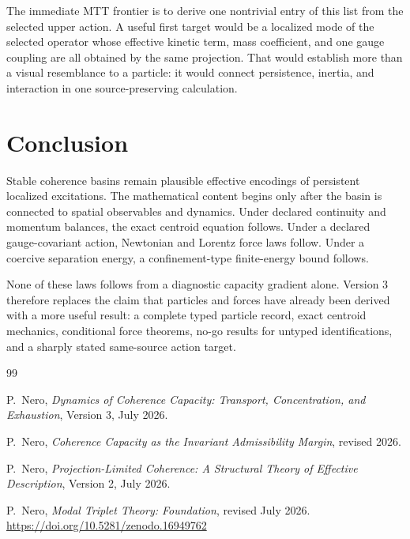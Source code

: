 \documentclass[11pt]{article}
\begin{document}
The immediate MTT frontier is to derive one nontrivial entry of this list from
the selected upper action.  A useful first target would be a localized mode of
the selected operator whose effective kinetic term, mass coefficient, and one
gauge coupling are all obtained by the same projection.  That would establish
more than a visual resemblance to a particle: it would connect persistence,
inertia, and interaction in one source-preserving calculation.

\section{Conclusion}

Stable coherence basins remain plausible effective encodings of persistent
localized excitations.  The mathematical content begins only after the basin
is connected to spatial observables and dynamics.  Under declared continuity
and momentum balances, the exact centroid equation follows.  Under a declared
gauge-covariant action, Newtonian and Lorentz force laws follow.  Under a
coercive separation energy, a confinement-type finite-energy bound follows.

None of these laws follows from a diagnostic capacity gradient alone.
Version 3 therefore replaces the claim that particles and forces have already
been derived with a more useful result: a complete typed particle record,
exact centroid mechanics, conditional force theorems, no-go results for
untyped identifications, and a sharply stated same-source action target.

\begin{thebibliography}{99}

P.~Nero,
\emph{Dynamics of Coherence Capacity: Transport, Concentration, and
Exhaustion},
Version 3, July 2026.

P.~Nero,
\emph{Coherence Capacity as the Invariant Admissibility Margin},
revised 2026.

P.~Nero,
\emph{Projection-Limited Coherence: A Structural Theory of Effective
Description},
Version 2, July 2026.

P.~Nero,
\emph{Modal Triplet Theory: Foundation},
revised July 2026.
\url{https://doi.org/10.5281/zenodo.16949762}

\end{thebibliography}
\end{document}
